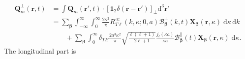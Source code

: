 \documentclass{article}
\begin{document}
\begin{equation}
\begin{split}
\mathbf{Q}_m^\perp(\mathbf{r},t) &= \int\mathbf{Q}_m(\mathbf{r}',t)\cdot\left[\bm{1}_2\delta(\mathbf{r} - \mathbf{r}')\right]_\perp\mathrm{d}^3\mathbf{r}'\\
&= \sum_{\bm{\beta}}\int_{-\infty}^\infty\int_0^\infty \frac{2\kappa^2}{\pi}R_{T\ell}^{\ll}(k,\kappa;0,a)\mathcal{B}_{\bm{\beta}}^\perp(k,t)\mathbf{X}_{\bm{\beta}}(\mathbf{r},\kappa)\;\mathrm{d}\kappa\,\mathrm{d}k\\
&\qquad+ \sum_{\bm{\beta}}\int_0^\infty \delta_{TE}\frac{2a^3\kappa^2}{\pi}\sqrt{\frac{\ell(\ell + 1)}{2\ell + 1}}\frac{j_\ell(\kappa a)}{\kappa a}\mathcal{B}_{\bm{\beta}}^\parallel(t)\mathbf{X}_{\bm{\beta}}(\mathbf{r},\kappa)\;\mathrm{d}\kappa.
\end{split}
\end{equation}
The longitudinal part is
\end{document}
